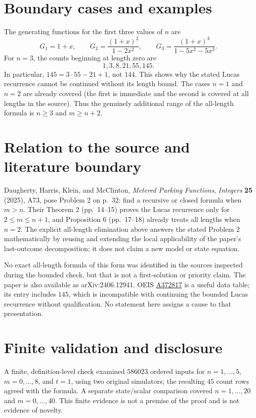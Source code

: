 \documentclass[11pt]{article}
\begin{document}
\section*{Boundary cases and examples}

The generating functions for the first three values of $n$ are
\[
 G_1=1+x,\qquad
 G_2=\frac{(1+x)^2}{1-2x^2},\qquad
 G_3=\frac{(1+x)^3}{1-5x^2-5x^3}.
\]
For $n=3$, the counts beginning at length zero are
\[
 1,3,8,21,55,145.
\]
In particular, $145=3\cdot55-21+1$, not $144$. This shows why the stated
Lucas recurrence cannot be continued without its length bound. The cases
$n=1$ and $n=2$ are already covered (the first is immediate and the second is
covered at all lengths in the source). Thus the genuinely additional range of
the all-length formula is $n\geq3$ and $m\geq n+2$.

\section*{Relation to the source and literature boundary}

Daugherty, Harris, Klein, and McClinton, \emph{Metered Parking Functions},
\emph{Integers} \textbf{25} (2025), A73, pose Problem 2 on p.~32: find a
recursive or closed formula when $m>n$. Their Theorem 2 (pp.~14--15) proves the
Lucas recurrence only for $2\leq m\leq n+1$, and Proposition 6 (pp.~17--18)
already treats all lengths when $n=2$. The explicit all-length elimination
above answers the stated Problem 2 mathematically by reusing and extending the
local applicability of the paper's last-outcome decomposition; it does not
claim a new model or state equation.

No exact all-length formula of this form was identified in the sources
inspected during the bounded check, but that is not a first-solution or
priority claim. The paper is also available as arXiv:2406.12941. OEIS
\href{https://oeis.org/A372817}{A372817} is a useful data table; its entry
includes $145$, which is incompatible with continuing the bounded Lucas
recurrence without qualification. No statement here assigns a cause to that
presentation.

\section*{Finite validation and disclosure}

A finite, definition-level check examined $586023$ ordered inputs for
$n=1,\ldots,5$, $m=0,\ldots,8$, and $t=1$, using two original simulators; the
resulting $45$ count rows agreed with the formula. A separate state/scalar
comparison covered $n=1,\ldots,20$ and $m=0,\ldots,40$. This finite evidence
is not a premise of the proof and is not evidence of novelty.
\end{document}
